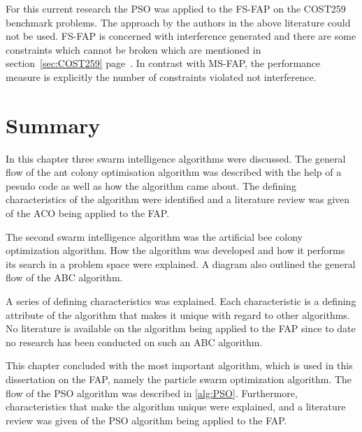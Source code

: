 For this current research the PSO was applied to the FS-FAP on the COST259 benchmark problems. The approach by the authors in the above literature could not be used. FS-FAP is concerned with interference generated and there are some constraints which cannot be broken which are mentioned in section~\ref{sec:COST259} page~\pageref{sec:COST259}. In contrast with MS-FAP, the performance measure is explicitly the number of constraints violated not interference.

\section{Summary}
\label{sec:SISummary}
In this chapter three swarm intelligence algorithms were discussed. The general flow of the ant colony optimisation algorithm was described with the help of a pesudo code as well as how the algorithm came about. The defining characteristics of the algorithm were identified and a literature review was given of the ACO being applied to the FAP.

The second swarm intelligence algorithm was the artificial bee colony optimization algorithm. How the algorithm was developed and how it performs its search in a problem space were explained. A diagram also outlined the general flow of the ABC algorithm.

A series of defining characteristics was explained. Each characteristic is a defining attribute of the algorithm that makes it unique with regard to other algorithms. No literature is available on the algorithm being applied to the FAP since to date no research has been conducted on such an ABC algorithm.

This chapter concluded with the most important algorithm, which is used in this dissertation on the FAP, namely the particle swarm optimization algorithm. The flow of the PSO algorithm was described in \ref{alg:PSO}. Furthermore, characteristics that make the algorithm unique were explained, and a literature review was given of the PSO algorithm being applied to the FAP.
